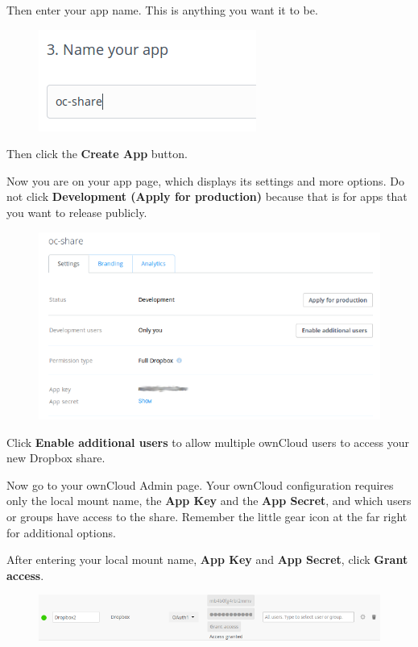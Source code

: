 \documentclass[letterpaper,10pt,english]{sphinxmanual}
\begin{document}
Then enter your app name. This is anything you want it to be.
\begin{figure}[htbp]
\centering

\includegraphics{dropbox-3.png}
\end{figure}

Then click the \textbf{Create App} button.

Now you are on your app page, which displays its settings and more options. Do
not click \textbf{Development (Apply for production)} because that is for apps
that you want to release publicly.
\begin{figure}[htbp]
\centering

\includegraphics{dropbox-4.png}
\end{figure}

Click \textbf{Enable additional users} to allow multiple ownCloud users to access
your new Dropbox share.

Now go to your ownCloud Admin page. Your ownCloud configuration requires only
the local mount name, the \textbf{App Key} and the \textbf{App Secret}, and which users
or groups have access to the share. Remember the little gear icon at the
far right for additional options.

After entering your local mount name, \textbf{App Key} and \textbf{App Secret}, click
\textbf{Grant access}.
\begin{figure}[htbp]
\centering

\includegraphics{dropbox-6.png}
\end{figure}
\end{document}
